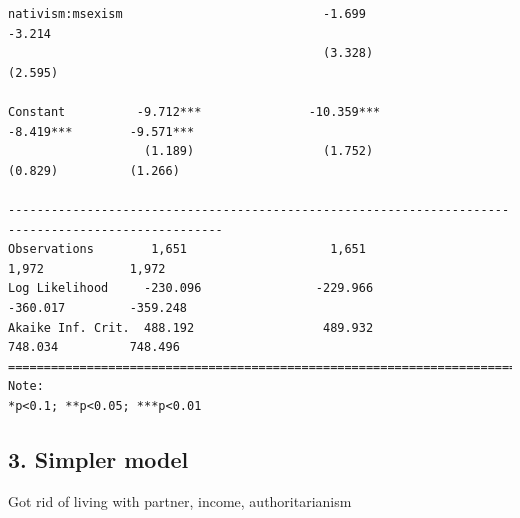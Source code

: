 \documentclass[
  letterpaper,
  DIV=11,
  numbers=noendperiod]{scrartcl}
\begin{document}
\begin{verbatim}
nativism:msexism                            -1.699                                    -3.214        
                                            (3.328)                                  (2.595)        
                                                                                                    
Constant          -9.712***               -10.359***               -8.419***        -9.571***       
                   (1.189)                  (1.752)                 (0.829)          (1.266)        
                                                                                                    
----------------------------------------------------------------------------------------------------
Observations        1,651                    1,651                   1,972            1,972         
Log Likelihood     -230.096                -229.966                 -360.017         -359.248       
Akaike Inf. Crit.  488.192                  489.932                 748.034          748.496        
====================================================================================================
Note:                                                                    *p<0.1; **p<0.05; ***p<0.01
\end{verbatim}

\subsection{3. Simpler model}\label{simpler-model}

Got rid of living with partner, income, authoritarianism
\end{document}
